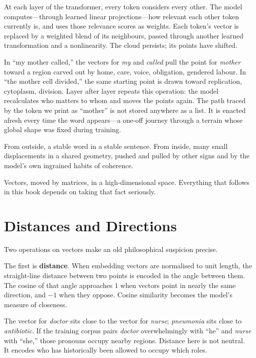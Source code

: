 \documentclass[12pt,a4paper]{article}
\begin{document}
At each layer of the transformer, every token considers every other. The model computes---through learned linear projections---how relevant each other token currently is, and uses those relevance scores as weights. Each token's vector is replaced by a weighted blend of its neighbours, passed through another learned transformation and a nonlinearity. The cloud persists; its points have shifted.

In ``my mother called,'' the vectors for \emph{my} and \emph{called} pull the point for \emph{mother} toward a region carved out by home, care, voice, obligation, gendered labour. In ``the mother cell divided,'' the same starting point is drawn toward replication, cytoplasm, division. Layer after layer repeats this operation: the model recalculates who matters to whom and moves the points again. The path traced by the token we print as ``mother'' is not stored anywhere as a list. It is enacted afresh every time the word appears---a one-off journey through a terrain whose global shape was fixed during training.

From outside, a stable word in a stable sentence. From inside, many small displacements in a shared geometry, pushed and pulled by other signs and by the model's own ingrained habits of coherence.

Vectors, moved by matrices, in a high-dimensional space. Everything that follows in this book depends on taking that fact seriously.

\section{Distances and Directions}

Two operations on vectors make an old philosophical suspicion precise.

The first is \textbf{distance}. When embedding vectors are normalised to unit length, the straight-line distance between two points is encoded in the angle between them. The cosine of that angle approaches $1$ when vectors point in nearly the same direction, and $-1$ when they oppose. Cosine similarity becomes the model's measure of closeness.

The vector for \emph{doctor} sits close to the vector for \emph{nurse}; \emph{pneumonia} sits close to \emph{antibiotic}. If the training corpus pairs \emph{doctor} overwhelmingly with ``he'' and \emph{nurse} with ``she,'' those pronouns occupy nearby regions. Distance here is not neutral. It encodes who has historically been allowed to occupy which roles.
\end{document}
